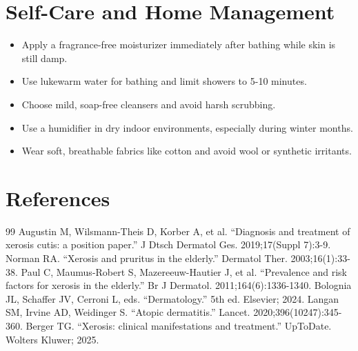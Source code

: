 \section*{Self-Care and Home Management}
\begin{itemize}
  \item Apply a fragrance-free moisturizer immediately after bathing while skin is still damp.
  \item Use lukewarm water for bathing and limit showers to 5-10 minutes.
  \item Choose mild, soap-free cleansers and avoid harsh scrubbing.
  \item Use a humidifier in dry indoor environments, especially during winter months.
  \item Wear soft, breathable fabrics like cotton and avoid wool or synthetic irritants.
\end{itemize}

\section*{References}
\begin{thebibliography}{99}
 Augustin M, Wilsmann-Theis D, Korber A, et al. ``Diagnosis and treatment of xerosis cutis: a position paper.'' J Dtsch Dermatol Ges. 2019;17(Suppl 7):3-9.
 Norman RA. ``Xerosis and pruritus in the elderly.'' Dermatol Ther. 2003;16(1):33-38.
 Paul C, Maumus-Robert S, Mazereeuw-Hautier J, et al. ``Prevalence and risk factors for xerosis in the elderly.'' Br J Dermatol. 2011;164(6):1336-1340.
 Bolognia JL, Schaffer JV, Cerroni L, eds. ``Dermatology.'' 5th ed. Elsevier; 2024.
 Langan SM, Irvine AD, Weidinger S. ``Atopic dermatitis.'' Lancet. 2020;396(10247):345-360.
 Berger TG. ``Xerosis: clinical manifestations and treatment.'' UpToDate. Wolters Kluwer; 2025.
\end{thebibliography}
